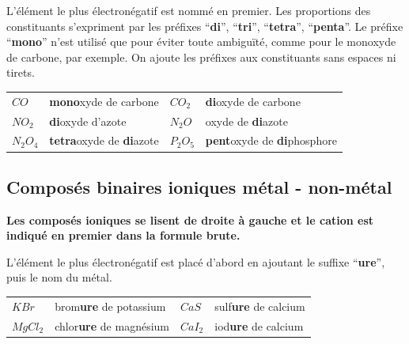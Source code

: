 \documentclass[
  11pt,
  a4paper,
  openany]{book}
\begin{document}
L'élément le plus électronégatif est nommé en premier. Les proportions des constituants s'expriment par les préfixes ``\textbf{di}'', ``\textbf{tri}'', ``\textbf{tetra}'', ``\textbf{penta}''. Le préfixe ``\textbf{mono}'' n'est utilisé que pour éviter toute ambiguïté, comme pour le monoxyde de carbone, par exemple. On ajoute les préfixes aux constituants sans espaces ni tirets.

\begin{longtable}[]{@{}
  >{\centering\arraybackslash}p{}
  >{\raggedright\arraybackslash}p{}
  >{\centering\arraybackslash}p{}
  >{\raggedright\arraybackslash}p{}@{}}
\toprule\noalign{}
\endhead
\bottomrule\noalign{}
\endlastfoot
\(CO\) & \textbf{mono}xyde de carbone & \(CO_2\) & \textbf{di}oxyde de carbone \\
\(NO_2\) & \textbf{di}oxyde d'azote & \(N_2O\) & oxyde de \textbf{di}azote \\
\(N_2O_4\) & \textbf{tetra}oxyde de \textbf{di}azote & \(P_2O_5\) & \textbf{pent}oxyde de \textbf{di}phosphore \\
\end{longtable}

\subsection{Composés binaires ioniques \textbar{} métal - non-métal}\label{composuxe9s-binaires-ioniques-muxe9tal---non-muxe9tal}

\textbf{Les composés ioniques se lisent de droite à gauche et le cation est indiqué en premier dans la formule brute.}

L'élément le plus électronégatif est placé d'abord en ajoutant le suffixe ``\textbf{ure}'', puis le nom du métal.

\begin{longtable}[]{@{}
  >{\centering\arraybackslash}p{}
  >{\raggedright\arraybackslash}p{}
  >{\centering\arraybackslash}p{}
  >{\raggedright\arraybackslash}p{}@{}}
\toprule\noalign{}
\endhead
\bottomrule\noalign{}
\endlastfoot
\(KBr\) & brom\textbf{ure} de potassium & \(CaS\) & sulf\textbf{ure} de calcium \\
\(MgCl_2\) & chlor\textbf{ure} de magnésium & \(CaI_2\) & iod\textbf{ure} de calcium \\
\end{longtable}
\end{document}
